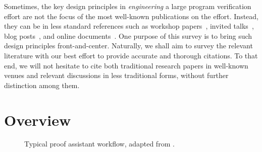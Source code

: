 Sometimes, the key design principles in \emph{engineering} a large program verification effort are not the focus of the most well-known publications on the effort. Instead, 
they can be in less standard references such as workshop papers~\citep{Komendantskaya2012,Blanchette2013,CompanyCoq2016,Mulhern06proofweaving}, invited talks~\citep{WenzelIsabelleFuture}, blog posts~\citep{VerifiedCryptoFirefox}, and online documents~\citep{LeroyDeepSpecSS17,WenzelScalingIsabelle}. One purpose of this survey is to bring such design principles front-and-center.  Naturally, we shall aim to survey the relevant literature with our best effort to provide accurate and thorough citations.  To that end, we will not hesitate to cite both traditional research papers in well-known venues and relevant discussions in less traditional forms, without further distinction among them.

\section{Overview}

\begin{figure}[ht]
  \centering
{\footnotesize
{}
}
\caption{Typical proof assistant workflow, adapted from \cite{pa-history-geuvers-sadhana09}.}
\label{fig:workflow}
\end{figure}

